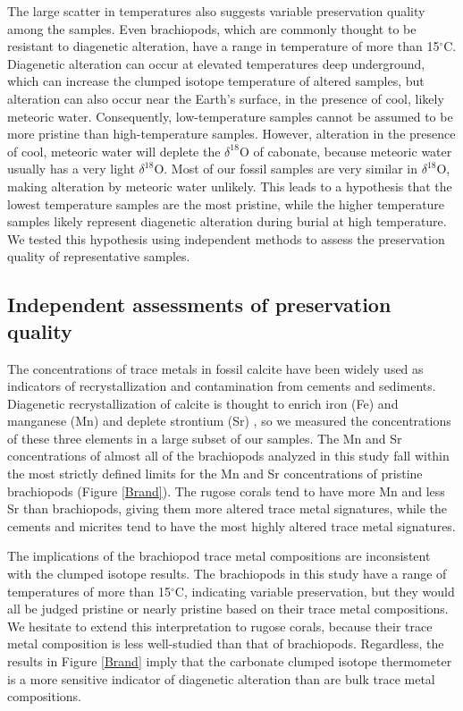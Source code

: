 \documentclass{article}
\newcommand{\deltao}{$\delta^{18}$}
\newcommand{\degrees}{$^{\circ}$}
\begin{document}
The large scatter in temperatures also suggests variable preservation quality among the samples. Even brachiopods, which are commonly thought to be resistant to diagenetic alteration, have a range in temperature of more than 15\degrees C. Diagenetic alteration can occur at elevated temperatures deep underground, which can increase the clumped isotope temperature of altered samples, but alteration can also occur near the Earth's surface, in the presence of cool, likely meteoric water. Consequently, low-temperature samples cannot be assumed to be more pristine than high-temperature samples. However, alteration in the presence of cool, meteoric water will deplete the \deltao O of cabonate, because meteoric water usually has a very light \deltao O. Most of our fossil samples are very similar in \deltao O, making alteration by meteoric water unlikely. This leads to a hypothesis that the lowest temperature samples are the most pristine, while the higher temperature samples likely represent diagenetic alteration during burial at high temperature. We tested this hypothesis using independent methods to assess the preservation quality of representative samples. 

\subsection{Independent assessments of preservation quality}

The concentrations of trace metals in fossil calcite have been widely used as indicators of recrystallization and contamination from cements and sediments. Diagenetic recrystallization of calcite is thought to enrich iron (Fe) and manganese (Mn) and deplete strontium (Sr) \citep{Brand1980,Shields2003}, so we measured the concentrations of these three elements in a large subset of our samples. The Mn and Sr concentrations of almost all of the brachiopods analyzed in this study fall within the most strictly defined limits for the Mn and Sr concentrations of pristine brachiopods (Figure \ref{Brand}). The rugose corals tend to have more Mn and less Sr than brachiopods, giving them more altered trace metal signatures, while the cements and micrites tend to have the most highly altered trace metal signatures. 

The implications of the brachiopod trace metal compositions are inconsistent with the clumped isotope results. The brachiopods in this study have a range of temperatures of more than 15\degrees C, indicating variable preservation, but they would all be judged pristine or nearly pristine based on their trace metal compositions. We hesitate to extend this interpretation to rugose corals, because their trace metal composition is less well-studied than that of brachiopods. Regardless, the results in Figure \ref{Brand} imply that the carbonate clumped isotope thermometer is a more sensitive indicator of diagenetic alteration than are bulk trace metal compositions.
\end{document}
